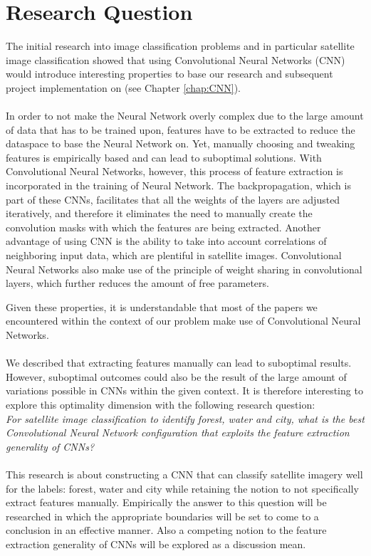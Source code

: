 \documentclass[a4paper,onecolumn]{report}
\begin{document}
\chapter{Research Question}
\label{chap:researchquestion}
The initial research into image classification problems and in particular satellite image classification showed that using Convolutional Neural Networks (CNN) would introduce interesting properties to base our research and subsequent project implementation on (see Chapter \ref{chap:CNN}).\\
\\
In order to not make the Neural Network overly complex due to the large amount of data that has to be trained upon, features have to be extracted to reduce the dataspace to base the Neural Network on. Yet, manually choosing and tweaking features is empirically based and can lead to suboptimal solutions. With Convolutional Neural Networks, however, this process of feature extraction is incorporated in the training of Neural Network. The backpropagation, which is part of these CNNs, facilitates that all the weights of the layers are adjusted iteratively, and therefore it eliminates the need to manually create the convolution masks with which the features are being extracted. Another advantage of using CNN is the ability to take into account correlations of neighboring input data, which are plentiful in satellite images. Convolutional Neural Networks also make use of the principle of weight sharing in convolutional layers, which further reduces the amount of free parameters.

Given these properties, it is understandable that most of the papers we encountered within the context of our problem make use of Convolutional Neural Networks.\\
\\
We described that extracting features manually can lead to suboptimal results. However, suboptimal outcomes could also be the result of the large amount of variations possible in CNNs within the given context. It is therefore interesting to explore this optimality dimension with the following research question:\\

\emph{For satellite image classification to identify forest, water and city, what is the best Convolutional Neural Network configuration that exploits the feature extraction generality of CNNs?}\\
\\
This research is about constructing a CNN that can classify satellite imagery well for the labels: forest, water and city while retaining the notion to not specifically extract features manually. Empirically the answer to this question will be researched in which the appropriate boundaries will be set to come to a conclusion in an effective manner. Also a competing notion to the feature extraction generality of CNNs will be explored as a discussion mean.
\end{document}

